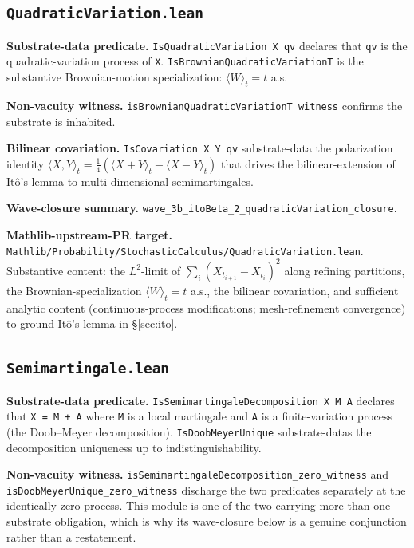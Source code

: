 \documentclass[11pt]{article}
\begin{document}
\subsection{\texttt{QuadraticVariation.lean}}

\textbf{Substrate-data predicate.}
\texttt{IsQuadraticVariation X qv} declares that \texttt{qv} is the
quadratic-variation process of \texttt{X}.
\texttt{IsBrownianQuadraticVariationT} is the substantive Brownian-motion
specialization: $\langle W\rangle_t = t$ a.s.

\textbf{Non-vacuity witness.}
\texttt{isBrownianQuadraticVariationT\_witness} confirms the
substrate is inhabited.

\textbf{Bilinear covariation.}
\texttt{IsCovariation X Y qv} substrate-data the polarization
identity $\langle X, Y\rangle_t = \frac{1}{4}(\langle X+Y\rangle_t - \langle X-Y\rangle_t)$
that drives the bilinear-extension of It\^o's lemma to multi-dimensional
semimartingales.

\textbf{Wave-closure summary.}
\texttt{wave\_3b\_itoBeta\_2\_quadraticVariation\_closure}.

\textbf{Mathlib-upstream-PR target.}
\texttt{Mathlib/Probability/StochasticCalculus/QuadraticVariation.lean}.
Substantive content: the $L^2$-limit of $\sum_i (X_{t_{i+1}} - X_{t_i})^2$
along refining partitions, the Brownian-specialization
$\langle W\rangle_t = t$ a.s., the bilinear covariation, and
sufficient analytic content (continuous-process modifications;
mesh-refinement convergence) to ground It\^o's lemma in
\S\ref{sec:ito}.

\subsection{\texttt{Semimartingale.lean}}

\textbf{Substrate-data predicate.}
\texttt{IsSemimartingaleDecomposition X M A} declares that
\texttt{X = M + A} where \texttt{M} is a local martingale and
\texttt{A} is a finite-variation process (the Doob--Meyer
decomposition).
\texttt{IsDoobMeyerUnique} substrate-datas the decomposition
uniqueness up to indistinguishability.

\textbf{Non-vacuity witness.}
\texttt{isSemimartingaleDecomposition\_zero\_witness} and
\texttt{isDoobMeyerUnique\_zero\_witness} discharge the two predicates
separately at the identically-zero process. This module is one of the
two carrying more than one substrate obligation, which is why its
wave-closure below is a genuine conjunction rather than a restatement.
\end{document}
